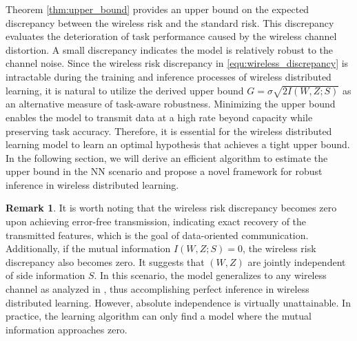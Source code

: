 \documentclass[lettersize,journal]{IEEEtran}
\theoremstyle{definition}
\newtheorem{remark}{Remark}
\theoremstyle{plain}
\begin{document}
Theorem \ref{thm:upper_bound} provides an upper bound on the expected discrepancy between the wireless risk and the standard risk. This discrepancy evaluates the deterioration of task performance caused by the wireless channel distortion. A small discrepancy indicates the model is relatively robust to the channel noise. Since the wireless risk discrepancy in \cref{equ:wireless_discrepancy} is intractable during the training and inference processes of wireless distributed learning, it is natural to utilize the derived upper bound $G=\sigma\sqrt{2I(W,Z;S)}$ as an alternative measure of task-aware robustness. Minimizing the upper bound enables the model to transmit data at a high rate beyond capacity while preserving task accuracy. Therefore, it is essential for the wireless distributed learning model to learn an optimal hypothesis that achieves a tight upper bound.
In the following section, we will derive an efficient algorithm to estimate the upper bound in the NN scenario and propose a novel framework for robust inference in wireless distributed learning.

\begin{remark}%
    \label{thm:special_case}
    It is worth noting that the wireless risk discrepancy becomes zero upon achieving error-free transmission, indicating exact recovery of the transmitted features, which is the goal of data-oriented communication.
    Additionally, if the mutual information $I(W,Z;S) = 0$, the wireless risk discrepancy also becomes zero. 
    It suggests that $(W,Z)$ are jointly independent of side information $S$. In this scenario, the model generalizes to any wireless channel as analyzed in \cite{PAC-Bayes}, thus accomplishing perfect inference in wireless distributed learning.
    However, absolute independence is virtually unattainable. In practice, the learning algorithm can only find a model where the mutual information approaches zero.
\end{remark}
\end{document}
